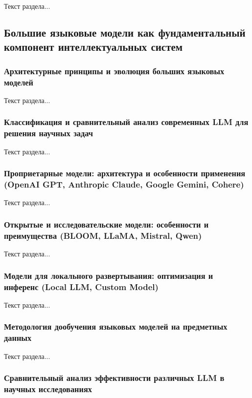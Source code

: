 Текст раздела...

\subsection{Большие языковые модели как фундаментальный компонент интеллектуальных систем}

\subsubsection{Архитектурные принципы и эволюция больших языковых моделей}

Текст раздела...

\subsubsection{Классификация и сравнительный анализ современных LLM для решения научных задач}

Текст раздела...

\subsubsection{Проприетарные модели: архитектура и особенности применения (OpenAI GPT, Anthropic Claude, Google Gemini, Cohere)}

Текст раздела...

\subsubsection{Открытые и исследовательские модели: особенности и преимущества (BLOOM, LLaMA, Mistral, Qwen)}

Текст раздела...

\subsubsection{Модели для локального развертывания: оптимизация и инференс (Local LLM, Custom Model)}

Текст раздела...

\subsubsection{Методология дообучения языковых моделей на предметных данных}

Текст раздела...

\subsubsection{Сравнительный анализ эффективности различных LLM в научных исследованиях}

